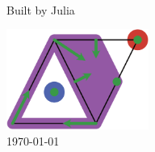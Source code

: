 \begin{titlingpage}
\begin{center}
\vspace*{2cm}\noindent

\Huge \textbf{  \DocMainTitle  }
\\[0.6cm]

{\LARGE  Built by Julia \JuliaVersion }
\vspace*{3cm}\par\noindent

\LARGE \textbf{ \DocAuthors }
\vfill

\includegraphics[width=0.35\textwidth]{assets/logo.png}
\\[1.5cm]

\Large
\DocVersion
\today

\end{center}
\end{titlingpage}
